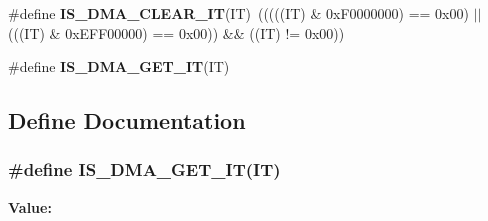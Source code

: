 \begin{DoxyCompactItemize}
\item 
\hypertarget{group__DMA__interrupts__definition_ga390481b083355ed774b04f70a42f0dfb}{
\#define {\bfseries IS\_\-DMA\_\-CLEAR\_\-IT}(IT)~(((((IT) \& 0xF0000000) == 0x00) $|$$|$ (((IT) \& 0xEFF00000) == 0x00)) \&\& ((IT) != 0x00))}
\label{group__DMA__interrupts__definition_ga390481b083355ed774b04f70a42f0dfb}

\item 
\#define {\bfseries IS\_\-DMA\_\-GET\_\-IT}(IT)
\end{DoxyCompactItemize}


\subsection{Define Documentation}
\hypertarget{group__DMA__interrupts__definition_gaaafa1bd74bc5e78e276c731faa8eed22}{
\subsubsection[{IS\_\-DMA\_\-GET\_\-IT}]{\setlength{\rightskip}{0pt plus 5cm}\#define IS\_\-DMA\_\-GET\_\-IT(IT)}}
\label{group__DMA__interrupts__definition_gaaafa1bd74bc5e78e276c731faa8eed22}
{\bfseries Value:}
